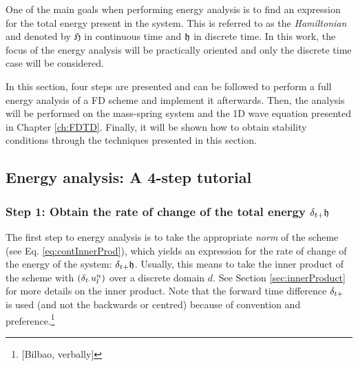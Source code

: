 {{One of the main goals when performing energy analysis is to find an expression for the total energy present in the system. This is referred to as the \textit{Hamiltonian} and denoted by $\mathfrak{H}$ in continuous time and $\mathfrak{h}$ in discrete time. In this work, the focus of the energy analysis will be practically oriented and only the discrete time case will be considered. %

In this section, four steps are presented and can be followed to perform a full energy analysis of a FD scheme and implement it afterwards. Then, the analysis will be performed on the mass-spring system and the 1D wave equation presented in Chapter \ref{ch:FDTD}. Finally, it will be shown how to obtain stability conditions through the techniques presented in this section. 

\subsection{Energy analysis: A 4-step tutorial}



\subsubsection{Step 1: Obtain the rate of change of the total energy $\delta_{t+} \mathfrak{h}$}
The first step to energy analysis is to take the appropriate \textit{norm} of the scheme (see Eq. \eqref{eq:contInnerProd}), which yields an expression for the rate of change of the energy of the system: $\delta_{t+}\mathfrak{h}$. Usually, this means to take the inner product of the scheme with $(\delta_{t\cdot} u_l^n)$ over a discrete domain $d$. See Section \ref{sec:innerProduct} for more details on the inner product. Note that the forward time difference $\delta_{t+}$ is used (and not the backwards or centred) because of convention and preference.\footnote{[Bilbao, verbally]}

}}
